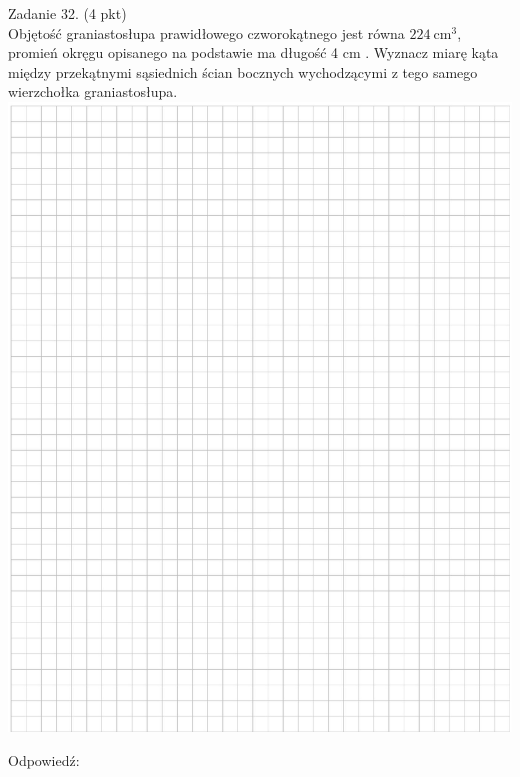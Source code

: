 \documentclass[10pt]{article}
\begin{document}
Zadanie 32. (4 pkt)\\
Objętość graniastosłupa prawidłowego czworokątnego jest równa \(224 \mathrm{~cm}^{3}\), promień okręgu opisanego na podstawie ma długość 4 cm . Wyznacz miarę kąta między przekątnymi sąsiednich ścian bocznych wychodzącymi z tego samego wierzchołka graniastosłupa.\\
\includegraphics[max width=\textwidth, center]{2024_11_21_b31e6de468170710de69g-15}

Odpowiedź:
\end{document}
